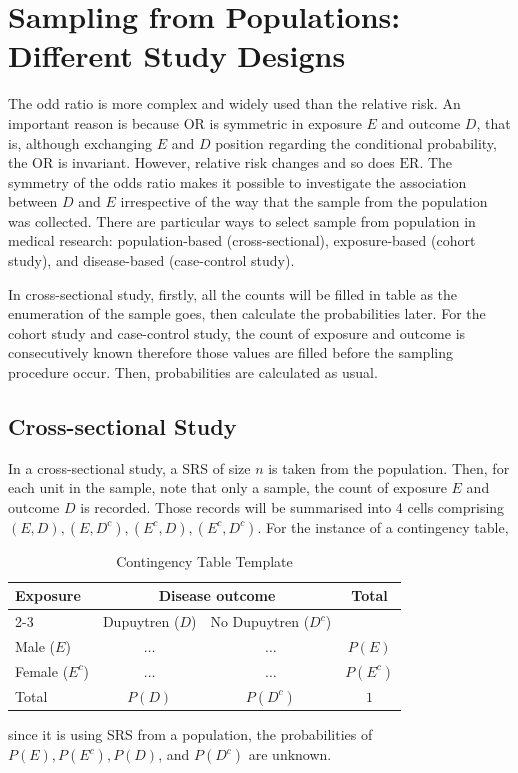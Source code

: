 \section{Sampling from Populations: Different Study Designs}
The odd ratio is more complex and widely used than the relative risk. An important reason is because $\mathrm{OR}$ is symmetric in exposure $E$ and outcome $D$, that is, although exchanging $E$ and $D$ position regarding the conditional 
probability, the $\mathrm{OR}$ is invariant. However, relative risk changes and so does $\mathrm{ER}$. The symmetry of the odds ratio makes it possible to investigate the association between $D$ and $E$ irrespective of the way that the sample from
the population was collected. There are particular ways to select sample from population in medical research: population-based (cross-sectional), exposure-based (cohort study), and disease-based (case-control study).

In cross-sectional study, firstly, all the counts will be filled in table as the enumeration of the sample goes, then calculate the probabilities later. For the cohort study and case-control study, the count of exposure and outcome is consecutively known therefore those values are filled before the 
sampling procedure occur. Then, probabilities are calculated as usual.

\subsection{Cross-sectional Study}
In a cross-sectional study, a SRS of size $n$ is taken from the population. Then, for each unit in the sample, note that only a sample, the count of exposure $E$ and outcome $D$ is recorded. Those records will be summarised into 4 cells comprising
$(E,D), (E,D^c), (E^c,D),(E^c,D^c)$. For the instance of a contingency table,
\begin{table}[H]
    \centering
    \begin{tabular}{l|cc|c}
        \hline
        \multirow{2}{*}{Exposure} & \multicolumn{2}{c|}{Disease outcome} & \multirow{2}{*}{Total} \\
        \cline{2-3}
        & Dupuytren ($D$) & No Dupuytren ($D^c$) & \\
        \hline\hline
        Male ($E$)   & $\ldots$  & $\ldots$ & $P(E)$ \\
        Female ($E^c$)   & $\ldots$  & $\ldots$ & $P(E^c)$ \\
        \hline
        Total & $P(D)$ & $P(D^c)$ & $1$ \\
        \hline
    \end{tabular}
    \caption{Contingency Table Template}
    \label{tab:CrossSectionalStudyTable}
\end{table}
since it is using SRS from a population, the probabilities of $P(E),P(E^c),P(D)$, and $P(D^c)$ are unknown.


